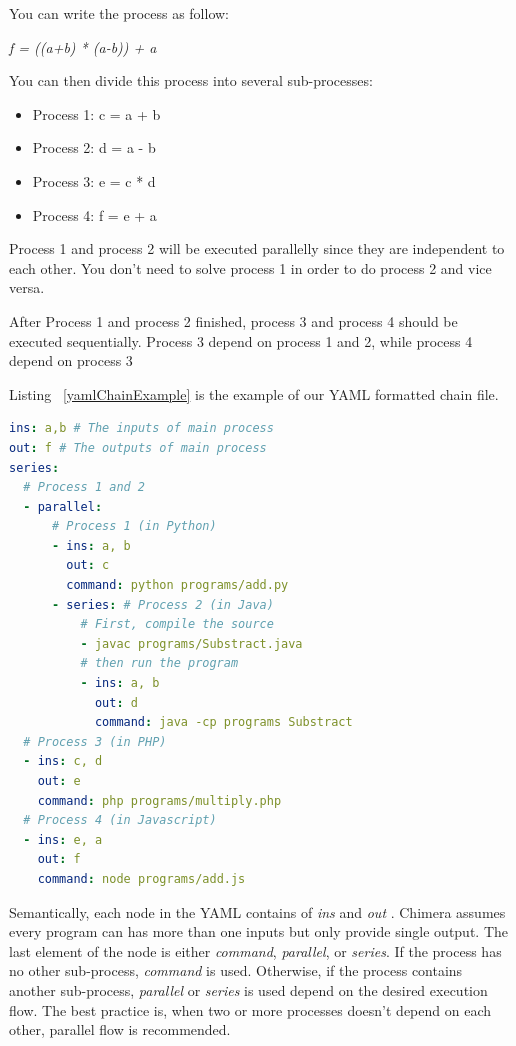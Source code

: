 \documentclass[conference]{IEEEtran}
\begin{document}
You can write the process as follow:

{\it f = ((a+b) * (a-b)) + a}

You can then divide this process into several sub-processes:

\begin{itemize}
    \item Process 1: c = a + b
    \item Process 2: d = a - b
    \item Process 3: e = c * d
    \item Process 4: f = e + a
\end{itemize}

Process 1 and process 2 will be executed parallelly since they are independent to each other. 
You don't need to solve process 1 in order to do process 2 and vice versa.

After Process 1 and process 2 finished, process 3 and process 4 should be executed sequentially. 
Process 3 depend on process 1 and 2, while process 4 depend on process 3

Listing ~\ref{yamlChainExample} is the example of our YAML formatted chain file.

\begin{lstlisting}[caption=YAML Chain Example, label=yamlChainExample, language=yaml, basicstyle=\small, breaklines=true]
ins: a,b # The inputs of main process 
out: f # The outputs of main process 
series:
  # Process 1 and 2 
  - parallel:
      # Process 1 (in Python) 
      - ins: a, b
        out: c
        command: python programs/add.py
      - series: # Process 2 (in Java) 
          # First, compile the source  
          - javac programs/Substract.java
          # then run the program 
          - ins: a, b
            out: d
            command: java -cp programs Substract
  # Process 3 (in PHP) 
  - ins: c, d
    out: e
    command: php programs/multiply.php
  # Process 4 (in Javascript) 
  - ins: e, a
    out: f
    command: node programs/add.js
\end{lstlisting}

Semantically, each node in the YAML contains of {\it ins} and {\it out }. Chimera 
assumes every program can has more than one inputs but only provide single output. 
The last element of the node is either {\it command}, {\it parallel}, or {\it series}. 
If the process has no other sub-process, {\it command} is used. Otherwise, if the
process contains another sub-process, {\it parallel} or {\it series} is used depend
on the desired execution flow. The best practice is, when two or more processes
doesn't depend on each other, parallel flow is recommended.
\end{document}
